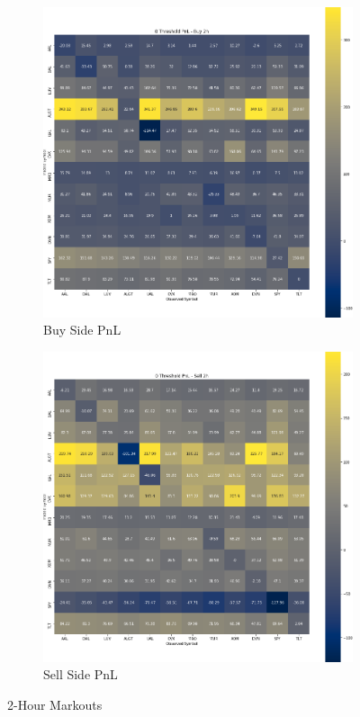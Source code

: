 \documentclass{article}
\begin{document}
\begin{figure}[h!]
  \centering
  \begin{subfigure}{.5\textwidth}
    \centering
    \includegraphics[width=.95\linewidth]{../Figures/pair_buy_pnl_2h.png}
    \caption{Buy Side PnL}
  \end{subfigure}%
  \begin{subfigure}{.5\textwidth}
    \centering
    \includegraphics[width=.95\linewidth]{../Figures/pair_sell_pnl_2h.png}
    \caption{Sell Side PnL}
  \end{subfigure}
  \caption{2-Hour Markouts}
\end{figure}
\end{document}
